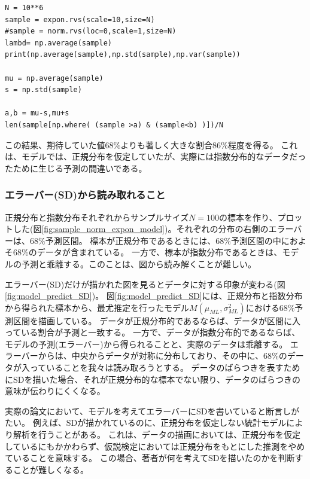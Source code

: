 \begin{lstlisting}
N = 10**6
sample = expon.rvs(scale=10,size=N)
#sample = norm.rvs(loc=0,scale=1,size=N)
lambd= np.average(sample)
print(np.average(sample),np.std(sample),np.var(sample))

mu = np.average(sample)
s = np.std(sample)

a,b = mu-s,mu+s
len(sample[np.where( (sample >a) & (sample<b) )])/N
\end{lstlisting}
この結果、期待していた値$68\%$よりも著しく大きな割合$86\%$程度を得る。
これは、モデルでは、正規分布を仮定していたが、実際には指数分布的なデータだったために生じる予測の間違いである。

\subsubsection{エラーバー(SD)から読み取れること}
正規分布と指数分布それぞれからサンプルサイズ$N=100$の標本を作り、プロットした(図\ref{fig:sample_norm_expon_model})。それぞれの分布の右側のエラーバーは、$68\%$予測区間。
標本が正規分布であるときには、$68\%$予測区間の中におよそ$68\%$のデータが含まれている。
一方で、標本が指数分布であるときは、モデルの予測と乖離する。このことは、図から読み解くことが難しい。

エラーバー(SD)だけが描かれた図を見るとデータに対する印象が変わる(図\ref{fig:model_predict_SD})。
図\ref{fig:model_predict_SD}には、正規分布と指数分布から得られた標本から、最尤推定を行ったモデル$M(\mu_{ML},\sigma^2_{ML})$における$68\%$予測区間を描画している。
データが正規分布的であるならば、データが区間に入っている割合が予測と一致する。
一方で、データが指数分布的であるならば、モデルの予測(エラーバー)から得られることと、実際のデータは乖離する。
エラーバーからは、中央からデータが対称に分布しており、その中に、$68\%$のデータが入っていることを我々は読み取ろうとする。
データのばらつきを表すためにSDを描いた場合、それが正規分布的な標本でない限り、データのばらつきの意味が伝わりにくくなる。

実際の論文において、モデルを考えてエラーバーにSDを書いていると断言しがたい。
例えば、SDが描かれているのに、正規分布を仮定しない統計モデルにより解析を行うことがある。
これは、データの描画においては、正規分布を仮定しているにもかかわらず、仮説検定においては正規分布をもとにした推測をやめていることを意味する。
この場合、著者が何を考えてSDを描いたのかを判断することが難しくなる。

